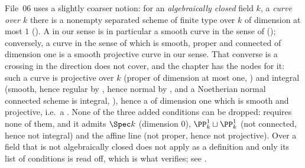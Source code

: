 \begin{remark}\label{rem:pc-relation-sc}
File~06 uses a slightly coarser notion: for an \emph{algebraically
closed} field $k$, a \emph{curve over $k$} there is a nonempty
separated scheme of finite type over $k$ of dimension at most $1$
().  A
 in
our sense is in particular a smooth curve in the sense of
 (); conversely, a
curve in the sense of  which is smooth, proper and
connected of dimension one is a smooth projective curve in our sense.
That converse is a crossing in the direction 
does not cover, and the chapter has the nodes for it: such a curve is
projective over $k$ (proper of dimension at most one,
) and integral (smooth, hence
regular by , hence normal by
, and a Noetherian normal connected
scheme is integral, ),
hence a  of dimension one which is smooth
and projective, i.e.\ a
.  None
of the three added conditions can be dropped: 
requires none of them, and it admits $\Spec k$ (dimension $0$),
$\PP^1_k\sqcup\PP^1_k$ (not connected, hence not integral) and the
affine line (not proper, hence not projective).  Over a
field that is not algebraically closed  does not
apply as a definition and only its list of conditions is read off, which
is what  verifies; see
.
\end{remark}

